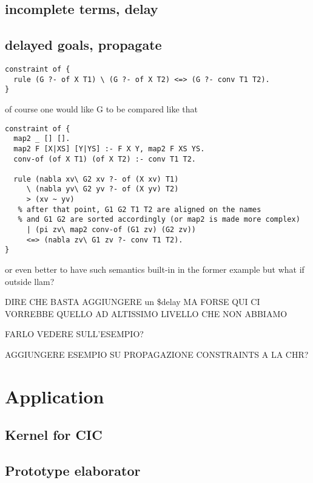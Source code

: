 \documentclass{easychair}
\begin{document}
\subsection{incomplete terms, delay}

\subsection{delayed goals, propagate}

\begin{verbatim}
constraint of {
  rule (G ?- of X T1) \ (G ?- of X T2) <=> (G ?- conv T1 T2).
}
\end{verbatim}

of course one would like G to be compared like that

\begin{verbatim}
constraint of {
  map2 _ [] [].
  map2 F [X|XS] [Y|YS] :- F X Y, map2 F XS YS.
  conv-of (of X T1) (of X T2) :- conv T1 T2.

  rule (nabla xv\ G2 xv ?- of (X xv) T1)
     \ (nabla yv\ G2 yv ?- of (X yv) T2)
     > (xv ~ yv)
   % after that point, G1 G2 T1 T2 are aligned on the names
   % and G1 G2 are sorted accordingly (or map2 is made more complex)
     | (pi zv\ map2 conv-of (G1 zv) (G2 zv))
     <=> (nabla zv\ G1 zv ?- conv T1 T2).
}
\end{verbatim}

or even better to have such semantics built-in in the former example
but what if outside llam?


DIRE CHE BASTA AGGIUNGERE un \$delay MA FORSE QUI CI VORREBBE QUELLO AD ALTISSIMO LIVELLO CHE NON ABBIAMO

FARLO VEDERE SULL'ESEMPIO?

AGGIUNGERE ESEMPIO SU PROPAGAZIONE CONSTRAINTS A LA CHR?

\section{Application}

\subsection{Kernel for CIC}

\subsection{Prototype elaborator}
\end{document}
